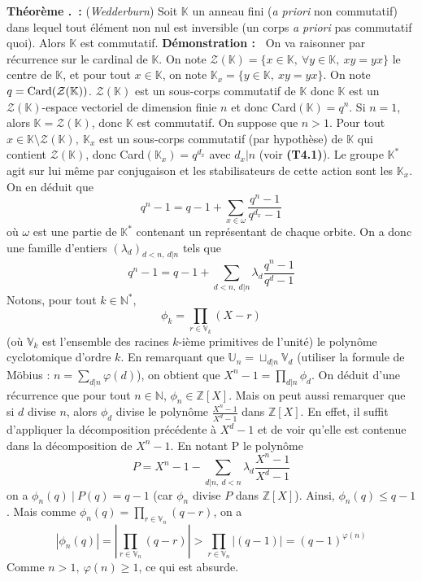 \documentclass[5pt,a4paper]{article}
\newcounter{thm}[section]
\renewcommand{\thethm}{\thesection.\arabic{thm}}
\newcommand{\thm}[1]{\stepcounter{thm}\noindent\textbf{Théorème \thethm ~:} #1 \newline}
\newcommand{\demo}[1]{\textbf{Démonstration :~} #1 \newline}
\begin{document}
\begin{onehalfspacing}
\thm{(\textit{Wedderburn}) Soit $\mathbb{K}$ un anneau fini (\textit{a priori} non commutatif) dans lequel tout élément non nul est inversible (un corps \textit{a priori} pas commutatif quoi). Alors $\mathbb{K}$ est commutatif.}
\demo{On va raisonner par récurrence sur le cardinal de $\mathbb{K}$. On note $\mathcal{Z}(\mathbb{K}) = \{x \in \mathbb{K},~\forall y \in \mathbb{K},~xy = yx\}$ le centre de $\mathbb{K}$, et pour tout $x \in \mathbb{K}$, on note $\mathbb{K}_x = \{y \in \mathbb{K},~xy = yx\}$. On note $q = \textup{Card}(\mathcal{Z}(\mathbb{K}))$. $\mathcal{Z}(\mathbb{K})$ est un sous-corps commutatif de $\mathbb{K}$ donc $\mathbb{K}$ est un $\mathcal{Z}(\mathbb{K})$-espace vectoriel de dimension finie $n$ et donc Card$(\mathbb{K}) = q^n$. Si $n = 1$, alors $\mathbb{K} = \mathcal{Z}(\mathbb{K})$, donc $\mathbb{K}$ est commutatif. On suppose que $n > 1$. Pour tout $x \in \mathbb{K} \setminus \mathcal{Z}(\mathbb{K}),~\mathbb{K}_x$ est un sous-corps commutatif (par hypothèse) de $\mathbb{K}$ qui contient $\mathcal{Z}(\mathbb{K})$, donc Card$(\mathbb{K}_x) = q^{d_x}$ avec $d_x | n$ (voir \textbf{(T4.1)}). Le groupe $\mathbb{K}^*$ agit sur lui même par conjugaison et les stabilisateurs de cette action sont les $\mathbb{K}_x$. On en déduit que 
\[q^n - 1 = q - 1 + \sum_{x \in \omega} \frac{q^n - 1}{q^{d_x} - 1} \]
où $\omega$ est une partie de $\mathbb{K}^*$ contenant un représentant de chaque orbite. On a donc une famille d'entiers $(\lambda_d)_{d < n,~d|n}$ tels que
\[q^n - 1 = q - 1 + \sum_{d < n,~d|n} \lambda_d\frac{q^n - 1}{q^d - 1} \]
Notons, pour tout $k \in \mathbb{N}^*$,
\[\phi_k = \prod_{r \in \mathbb{V}_k} (X - r)\]
(où $\mathbb{V}_k$ est l'ensemble des racines $k$-ième primitives de l'unité) le polynôme cyclotomique d'ordre $k$. En remarquant que $\mathbb{U}_n = \sqcup_{d | n} \mathbb{V}_d$ (utiliser la formule de Möbius : $n = \sum_{d | n} \varphi(d)$), on obtient que $X^n - 1 = \prod_{d | n} \phi_d$. On déduit d'une récurrence que pour tout $n \in \mathbb{N}$, $\phi_n \in \mathbb{Z}[X]$. Mais on peut aussi remarquer que si $d$ divise $n$, alors $\phi_d$ divise le polynôme $\frac{X^n - 1}{X^d - 1}$ dans $\mathbb{Z}[X]$. En effet, il suffit d'appliquer la décomposition précédente à $X^d - 1$ et de voir qu'elle est contenue dans la décomposition de $X^n - 1$. En notant P le polynôme
\[P = X^n - 1 - \sum_{d | n, ~ d < n} \lambda_d\frac{X^n - 1}{X^d - 1}\]
on a $\phi_n(q)~|~P(q) = q - 1$ (car $\phi_n$ divise $P$ dans $\mathbb{Z}[X]$). Ainsi, $\phi_n(q) \leq q - 1$. Mais comme $\phi_n(q) = \prod_{r \in \mathbb{V}_n} (q - r)$, on a 
\[|\phi_n(q)| = |\prod_{r \in \mathbb{V}_n} (q - r)| > \prod_{r \in \mathbb{V}_n} |(q - 1)| = (q-1)^{\varphi(n)}\]
Comme $n > 1,~\varphi(n) \geq 1$, ce qui est absurde.}


\end{onehalfspacing}
\end{document}
